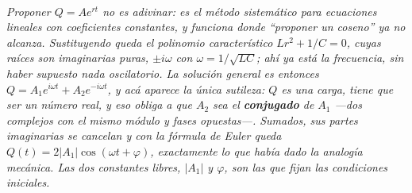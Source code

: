 \begin{center}
\begin{tikzpicture}[scale=1]
\end{tikzpicture}\\[0.5em]
{\small\itshape Proponer $Q = A e^{rt}$ no es adivinar: es el método sistemático
para ecuaciones lineales con coeficientes constantes, y funciona donde
``proponer un coseno'' ya no alcanza. Sustituyendo queda el polinomio
característico $Lr^2 + 1/C = 0$, cuyas raíces son \emph{imaginarias puras},
$\pm i\omega$ con $\omega = 1/\sqrt{LC}$; ahí ya está la frecuencia, sin haber
supuesto nada oscilatorio. La solución general es entonces
$Q = A_1 e^{i\omega t} + A_2 e^{-i\omega t}$, y acá aparece la única sutileza:
$Q$ es una carga, tiene que ser un número real, y eso obliga a que $A_2$ sea el
\textbf{conjugado} de $A_1$ ---dos complejos con el mismo módulo y fases
opuestas---. Sumados, sus partes imaginarias se cancelan y con la fórmula de
Euler queda $Q(t) = 2|A_1|\cos(\omega t+\varphi)$, exactamente lo que había dado
la analogía mecánica. Las dos constantes libres, $|A_1|$ y $\varphi$, son las
que fijan las condiciones iniciales.}
\end{center}

